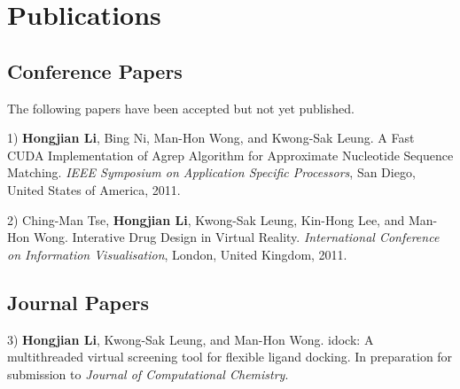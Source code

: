\chapter{Publications}

\section{Conference Papers}

The following papers have been accepted but not yet published.

1) \textbf{Hongjian Li}, Bing Ni, Man-Hon Wong, and Kwong-Sak Leung. A Fast CUDA Implementation of Agrep Algorithm for Approximate Nucleotide Sequence Matching. \textit{IEEE Symposium on Application Specific Processors}, San Diego, United States of America, 2011.

2) Ching-Man Tse, \textbf{Hongjian Li}, Kwong-Sak Leung, Kin-Hong Lee, and Man-Hon Wong. Interative Drug Design in Virtual Reality. \textit{International Conference on Information Visualisation}, London, United Kingdom, 2011.

\section{Journal Papers}

3) \textbf{Hongjian Li}, Kwong-Sak Leung, and Man-Hon Wong. idock: A multithreaded virtual screening tool for flexible ligand docking. In preparation for submission to \textit{Journal of Computational Chemistry}.

\chapterend

